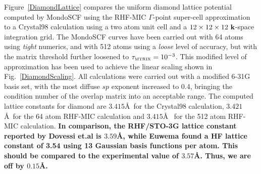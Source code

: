 \documentclass[prb,aps,nobibnotes,twocolumn,doublespace,twocolumngrid,superbib]{revtex4}
\begin{document}
\begin{table}[h]
\caption{Lattice Constants for the Diamond System for different 
system sizes, theory levels, and basis sets calculated at the $\Gamma$-point}
\label{DamondLC}
\end{table}


Figure~\ref{DiamondLattice} compares the uniform diamond lattice potential computed 
by MondoSCF using the RHF-MIC $\Gamma$-point super-cell approximation to a {\sc Crystal98}
calculation using a two atom unit cell and a $12 \times 12 \times 12 ~{\bf k}$-space integration grid.
The {\sc MondoSCF} curves have been carried out with 64 atoms using {\it tight}
numerics, and with 512 atoms using a {\it loose} level of accuracy, but with the matrix
threshold further loosened to $\Huge \tau_{\rm \scriptscriptstyle MTRIX}=10^{-3}$. 
This modified level of approximation has been used to achieve the linear scaling shown 
in Fig.~\ref{DiamondScaling}. All calculations were carried out with a modified 6-31G basis set, 
with the most diffuse $sp$ exponent increased to 0.4, bringing the condition number 
of the overlap matrix into an acceptable range.  The computed lattice constants 
for diamond are $3.415$\AA~for the {\sc Crystal98} calculation, $3.421$\AA~for 
the 64 atom RHF-MIC calculation and $3.415$\AA~ for the 512 atom RHF-MIC calculation.
{\bf In comparison, the RHF/STO-3G lattice constant reported by Dovessi et.al \cite{RDovesi80b} 
is $3.59$\AA, while Euwema \cite{REuwema73} found a HF lattice constant of 3.54 using 13 
Gaussian basis functions per atom.  This should be compared to the experimental value of $3.57$\AA.
Thus, we are off by $0.15$\AA. }
\end{document}

